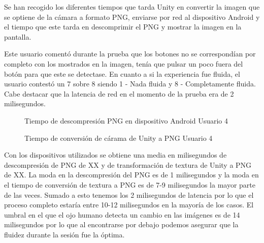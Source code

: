 \begin{enumerate}
Se han recogido los diferentes tiempos que tarda Unity en convertir la imagen que se optiene de la c\'amara a formato PNG, enviarse por red al dispositivo Android y el tiempo que este tarda en descomprimir el PNG y mostrar la imagen en la pantalla. 

Este usuario coment\'o durante la prueba que los botones no se correspond\'ian por completo con los mostrados en la imagen, ten\'ia que pulsar un poco fuera del bot\'on para que este se detectase. En cuanto a si la experiencia fue fluida, el usuario contest\'o un 7 sobre 8 siendo 1 - Nada fluida y 8 - Completamente fluida. Cabe destacar que la latencia de red en el momento de la prueba era de 2 milisegundos.

\begin{figure}[!h]
\centering
{}%
\caption{Tiempo de descompresi\'on PNG en dispositivo Android Usuario 4}
\end{figure}

\begin{figure}[!h]
\centering
{}%
\caption{Tiempo de conversi\'on de c\'arama de Unity a PNG Usuario 4}
\end{figure}

Con los dispositivos utilizados se obtiene una media en milisegundos de descompresi\'on de PNG de XX y de transformaci\'on de textura de Unity a PNG de XX. La moda en la descompresi\'on del PNG es de 1 milisegundos y la moda en el tiempo de conversi\'on de textura a PNG es de 7-9 milisegundos la mayor parte de las veces. Sumado a esto tenemos los 2 milisegundos de latencia por lo que el proceso completo estar\'ia entre 10-12 milisegundos en la mayor\'ia de los casos. El umbral en el que el ojo humano detecta un cambio en las im\'agenes es de 14 milisegundos por lo que al encontrarse por debajo podemos asegurar que la fluidez durante la sesi\'on fue la \'optima.


\end{enumerate}
